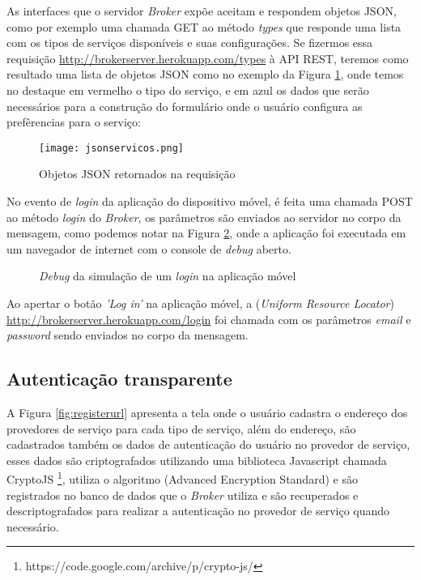 As interfaces que o servidor \textit{Broker} expõe aceitam e respondem objetos JSON, como por exemplo uma chamada GET ao método \textit{types} que responde uma lista com os tipos de serviços disponíveis e suas configurações.
Se fizermos essa requisição \url{http://brokerserver.herokuapp.com/types} à API REST, teremos como resultado uma lista de objetos JSON como no exemplo da Figura \ref{fig:jsonservicos}, onde temos no destaque em vermelho o tipo do serviço, e em azul os dados que serão necessários para a construção do formulário onde o usuário configura as prefêrencias para o serviço:

\begin{figure}[!htb]
  \centering
  \texttt{[image: jsonservicos.png]} %
  \caption[Objetos JSON retornados na requisição]{Objetos JSON retornados na requisição}
  \label{fig:jsonservicos}
\end{figure}

No evento de \textit{login} da aplicação do dispositivo móvel, é feita uma chamada POST ao método \textit{login} do \textit{Broker}, os parâmetros são enviados ao servidor no corpo da mensagem, como podemos notar na Figura \ref{fig:logindebug}, onde a aplicação foi executada em um navegador de internet com o console de \textit{debug} aberto.

\begin{figure}[h]
  \center
  \qquad
  \caption[\textit{Debug} da simulação de um \textit{login} na aplicação móvel]{\textit{Debug} da simulação de um \textit{login} na aplicação móvel}
  \label{fig:logindebug}
\end{figure}

Ao apertar o botão \textit{'Log in'} na aplicação móvel, a  (\textit{Uniform Resource Locator}) \url{
http://brokerserver.herokuapp.com/login} foi chamada com os parâmetros \textit{email} e \textit{password} sendo enviados no corpo da mensagem.

\subsection{Autenticação transparente}

A Figura \ref{fig:registerurl} apresenta a tela onde o usuário cadastra o endereço dos provedores de serviço para cada tipo de serviço, além do endereço, são cadastrados também os dados de autenticação do usuário no provedor de serviço, esses dados são criptografados utilizando uma biblioteca Javascript chamada CryptoJS \footnote{https://code.google.com/archive/p/crypto-js/}, utiliza o algoritmo  (Advanced Encryption Standard) e são registrados no banco de dados que o \textit{Broker} utiliza e são recuperados e descriptografados para realizar a autenticação no provedor de serviço quando necessário.

